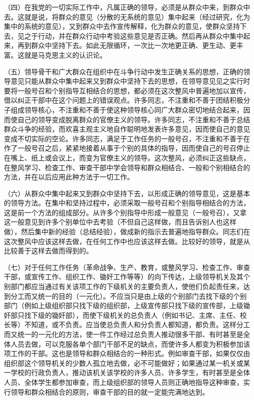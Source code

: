 （四）在我党的一切实际工作中，凡属正确的领导，必须是从群众中来，到群众中去。这就是说，将群众的意见（分散的无系统的意见）集中起来（经过研究，化为集中的系统的意见），又到群众中去作宣传解释，化为群众的意见，使群众坚持下去，见之于行动，并在群众行动中考验这些意见是否正确。然后再从群众中集中起来，再到群众中坚持下去。如此无限循环，一次比一次地更正确、更生动、更丰富。这就是马克思主义的认识论。

（五）领导骨干和广大群众在组织中在斗争行动中发生正确关系的思想，正确的领导意见只能从群众中集中起来又到群众中坚持下去的思想，在领导意见见之实行时要将一般号召和个别指导互相结合的思想，都必须在这次整风中普遍地加以宣传，借以纠正干部中在这个问题上的错误观点。许多同志，不注重和不善于团结积极分子组成领导核心，不注重和不善于使这种领导核心同广大群众密切地结合起来，因而使自己的领导变成脱离群众的官僚主义的领导。许多同志，不注重和不善于总结群众斗争的经验，而欢喜主观主义地自作聪明地发表许多意见，因而使自己的意见变成不切实际的空论。许多同志，满足于工作任务的一般号召，不注重和不善于在作了一般号召之后，紧紧地接着从事于个别的具体的指导，因而使自己的号召停止在嘴上、纸上或会议上，而变为官僚主义的领导。这次整风，必须纠正这些缺点，在整风学习、检查工作、审查干部中学会领导和群众相结合、一般和个别相结合的方法，并在以后应用此种方法于一切工作。

（六）从群众中集中起来又到群众中坚持下去，以形成正确的领导意见，这是基本的领导方法。在集中和坚持过程中，必须采取一般号召和个别指导相结合的方法，这是前一个方法的组成部分。从许多个别指导中形成一般意见（一般号召），又拿这一般意见到许多个别单位中去考验（不但自己这样做，而且告诉别人也这样做），然后集中新的经验（总结经验），做成新的指示去普遍地指导群众。同志们在这次整风中应该这样去做，在任何工作中也应该这样去做。比较好的领导，就是从比较善于这样去做而得到的。

（七）对于任何工作任务（革命战争、生产、教育，或整风学习、检查工作、审查干部，或宣传工作、组织工作、锄奸工作等等）的向下传达，上级领导机关及其个别部门都应当通过有关该项工作的下级机关的主要负责人，使他们负起责任来，达到分工而又统一的目的（一元化）。不应当只是由上级的个别部门去找下级的个别部门（例如上级组织部只找下级的组织部，上级宣传部只找下级的宣传部，上级锄奸部只找下级的锄奸部），而使下级机关的总负责人（例如书记、主席、主任、校长等）不知道，或不负责。应当使总负责人和分负责人都知道，都负责。这样分工而又统一的一元化的方法，使一件工作经过总负责人推动很多干部、有时甚至是全体人员去做，可以克服各单个部门干部不足的缺点，而使许多人都变为积极参加该项工作的干部。这也是领导和群众相结合的一种形式。例如审查干部，如果仅仅由组织部这个领导机关的少数人孤立地去做，必不可能做好；如果通过某一机关或某一学校的行政负责人，推动该机关该学校的许多人员、许多学生，有时甚至是全体人员、全体学生都参加审查，而上级组织部的领导人员则正确地指导这种审查，实行领导和群众相结合的原则，审查干部的目的就一定能完满地达到。

